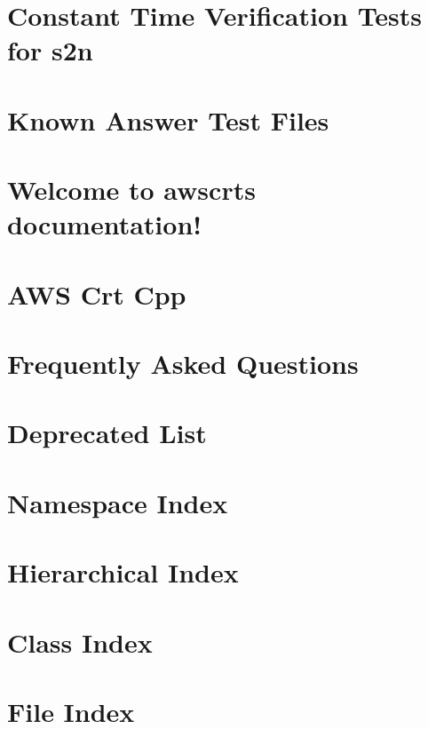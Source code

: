 \documentclass[twoside]{book}
\newcommand{\+}{\discretionary{\mbox{\scriptsize$\hookleftarrow$}}{}{}}
\begin{document}
\chapter{Constant Time Verification Tests for s2n}
\label{md_crt_aws_crt_cpp_crt_s2n_tests_sidetrail__r_e_a_d_m_e}

\chapter{Known Answer Test Files}
\label{md_crt_aws_crt_cpp_crt_s2n_tests_unit_kats__r_e_a_d_m_e}

\chapter{Welcome to awscrt\textquotesingle{}s documentation!}
\label{md_crt_aws_crt_cpp_docsrc_index}

\chapter{AWS Crt Cpp}
\label{md_crt_aws_crt_cpp__r_e_a_d_m_e}

\chapter{Frequently Asked Questions}
\label{md__f_a_q}

\chapter{Deprecated List}
\label{deprecated}

\chapter{Namespace Index}

\chapter{Hierarchical Index}

\chapter{Class Index}

\chapter{File Index}

\end{document}
